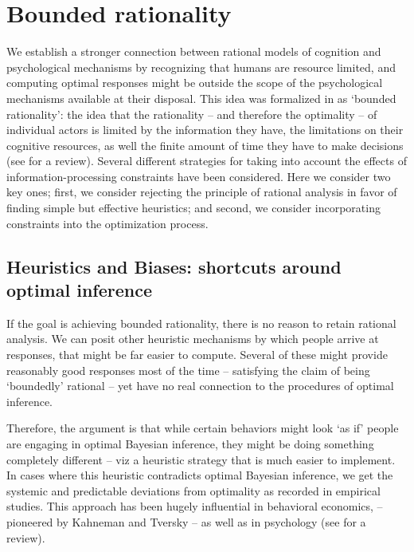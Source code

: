 \section{Bounded rationality}
\label{sec:psych_BR}

We establish a stronger connection between rational models of cognition and psychological mechanisms by recognizing that humans are resource limited, and computing optimal responses might be outside the scope of the psychological mechanisms available at their disposal. This idea was formalized in \citet{simon1955behavioral} as `bounded rationality': the idea that the rationality -- and therefore the optimality -- of individual actors is limited by the information they have, the limitations on their cognitive resources, as well the finite amount of time they have to make decisions (see \citet{russell2016rationality} for a review). Several different strategies for taking into account the effects of information-processing constraints have been considered. Here we consider two key ones; first, we consider rejecting the principle of rational analysis in favor of finding simple but effective heuristics; and second, we consider incorporating constraints into the optimization process.

\subsection{Heuristics and Biases: shortcuts around optimal inference}

If the goal is achieving bounded rationality, there is no reason to retain rational analysis. We can posit other heuristic mechanisms by which people arrive at responses, that might be far easier to compute. Several of these might provide reasonably good responses most of the time -- satisfying the claim of being `boundedly' rational -- yet have no real connection to the procedures of optimal inference. 

Therefore, the argument is that while certain behaviors might look `as if' people are engaging in optimal Bayesian inference, they might be doing something completely different -- viz a heuristic strategy that is much easier to implement. In cases where this heuristic contradicts optimal Bayesian inference, we get the systemic and predictable deviations from optimality as recorded in empirical studies. This approach has been hugely influential in behavioral economics, -- pioneered by Kahneman and Tversky\cite{tversky} -- as well as in psychology (see \citet{gigerenzer2002bounded} for a review). 

